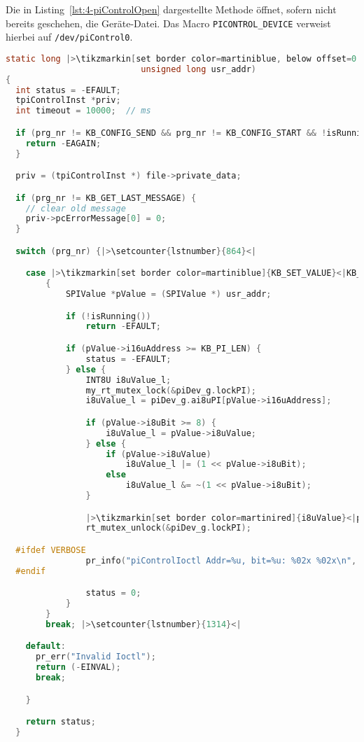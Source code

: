 Die in Listing~\ref{lst:4-piControlOpen} dargestellte Methode öffnet, sofern nicht bereits geschehen, die Geräte-Datei. Das Macro \lstinline{PICONTROL_DEVICE} verweist hierbei auf \lstinline{/dev/piControl0}.

\begin{lstlisting}[language={c},firstnumber=721,caption={Methode \lstinline{piControlIoctl} in \lstinline{piControlMain.c}\label{lst:4-piControlIoctl}}]
static long |>\tikzmarkin[set border color=martiniblue, below offset=0.9em]{piControlIoctl}<|piControlIoctl(struct file *file, unsigned int prg_nr, 
                           unsigned long usr_addr)                                      |>\tikzmarkend{piControlIoctl}<|
{
  int status = -EFAULT;
  tpiControlInst *priv;
  int timeout = 10000;	// ms

  if (prg_nr != KB_CONFIG_SEND && prg_nr != KB_CONFIG_START && !isRunning()) {
  	return -EAGAIN;
  }

  priv = (tpiControlInst *) file->private_data;

  if (prg_nr != KB_GET_LAST_MESSAGE) {
  	// clear old message
  	priv->pcErrorMessage[0] = 0;
  }

  switch (prg_nr) {|>\setcounter{lstnumber}{864}<|

    case |>\tikzmarkin[set border color=martiniblue]{KB_SET_VALUE}<|KB_SET_VALUE:|>\tikzmarkend{KB_SET_VALUE}<|
  		{
  			SPIValue *pValue = (SPIValue *) usr_addr;

  			if (!isRunning())
  				return -EFAULT;

  			if (pValue->i16uAddress >= KB_PI_LEN) {
  				status = -EFAULT;
  			} else {
  				INT8U i8uValue_l;
  				my_rt_mutex_lock(&piDev_g.lockPI);
  				i8uValue_l = piDev_g.ai8uPI[pValue->i16uAddress];

  				if (pValue->i8uBit >= 8) {
  					i8uValue_l = pValue->i8uValue;
  				} else {
  					if (pValue->i8uValue)
  						i8uValue_l |= (1 << pValue->i8uBit);
  					else
  						i8uValue_l &= ~(1 << pValue->i8uBit);
  				}

  				|>\tikzmarkin[set border color=martinired]{i8uValue}<|piDev_g.ai8uPI[pValue->i16uAddress] = i8uValue_l;|>\tikzmarkend{i8uValue}<|
  				rt_mutex_unlock(&piDev_g.lockPI);

  #ifdef VERBOSE
  				pr_info("piControlIoctl Addr=%u, bit=%u: %02x %02x\n", pValue->i16uAddress, pValue->i8uBit, pValue->i8uValue, i8uValue_l);
  #endif

  				status = 0;
  			}
  		}
  		break; |>\setcounter{lstnumber}{1314}<|

    default:
      pr_err("Invalid Ioctl");
      return (-EINVAL);
      break;

    }

    return status;
  }
\end{lstlisting}

